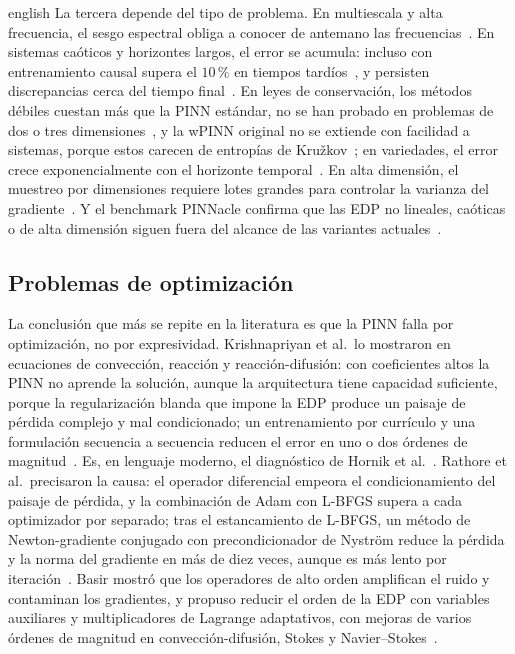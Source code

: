 \documentclass[0000.tex]{subfiles}
\begin{document}
\begin{hyphenrules}{english}
La tercera depende del tipo de problema. En multiescala y alta frecuencia, el sesgo espectral obliga a conocer de antemano las frecuencias~\cite{wang2021eigenvector}. En sistemas caóticos y horizontes largos, el error se acumula: incluso con entrenamiento causal supera el $10$\,\% en tiempos tardíos~\cite{wang2022respecting}, y persisten discrepancias cerca del tiempo final~\cite{wang2023expert}. En leyes de conservación, los métodos débiles cuestan más que la PINN estándar, no se han probado en problemas de dos o tres dimensiones~\cite{de2024wpinns,chaumet2024improving}, y la wPINN original no se extiende con facilidad a sistemas, porque estos carecen de entropías de Kružkov~\cite{de2024wpinns}; en variedades, el error crece exponencialmente con el horizonte temporal~\cite{zhou2025weak}. En alta dimensión, el muestreo por dimensiones requiere lotes grandes para controlar la varianza del gradiente~\cite{hu2024tackling}. Y el benchmark PINNacle confirma que las EDP no lineales, caóticas o de alta dimensión siguen fuera del alcance de las variantes actuales~\cite{hao2024pinnacle}.

\subsection{Problemas de optimización}
\label{subsec:ea-opt}

La conclusión que más se repite en la literatura es que la PINN falla por optimización, no por expresividad. Krishnapriyan et al.\ lo mostraron en ecuaciones de convección, reacción y reacción-difusión: con coeficientes altos la PINN no aprende la solución, aunque la arquitectura tiene capacidad suficiente, porque la regularización blanda que impone la EDP produce un paisaje de pérdida complejo y mal condicionado; un entrenamiento por currículo y una formulación secuencia a secuencia reducen el error en uno o dos órdenes de magnitud~\cite{krishnapriyan2021characterizing}. Es, en lenguaje moderno, el diagnóstico de Hornik et al.~\cite{hornik1989multilayer}. Rathore et al.\ precisaron la causa: el operador diferencial empeora el condicionamiento del paisaje de pérdida, y la combinación de Adam con L-BFGS supera a cada optimizador por separado; tras el estancamiento de L-BFGS, un método de Newton-gradiente conjugado con precondicionador de Nyström reduce la pérdida y la norma del gradiente en más de diez veces, aunque es más lento por iteración~\cite{rathore2024challenges}. Basir mostró que los operadores de alto orden amplifican el ruido y contaminan los gradientes, y propuso reducir el orden de la EDP con variables auxiliares y multiplicadores de Lagrange adaptativos, con mejoras de varios órdenes de magnitud en convección-difusión, Stokes y Navier--Stokes~\cite{basir2022investigating}.


\end{hyphenrules}
\end{document}
